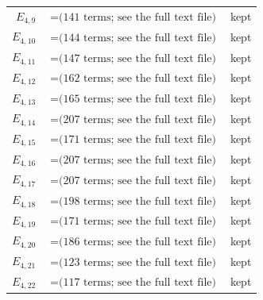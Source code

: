 \documentclass[10pt]{article}
\begin{document}
\begin{longtable}{r>{\raggedright\arraybackslash}p{}>{\raggedright\arraybackslash}p{}}
$E_{4,9}$ & $= \text{(141 terms; see the full text file)}$ & kept \\
$E_{4,10}$ & $= \text{(144 terms; see the full text file)}$ & kept \\
$E_{4,11}$ & $= \text{(147 terms; see the full text file)}$ & kept \\
$E_{4,12}$ & $= \text{(162 terms; see the full text file)}$ & kept \\
$E_{4,13}$ & $= \text{(165 terms; see the full text file)}$ & kept \\
$E_{4,14}$ & $= \text{(207 terms; see the full text file)}$ & kept \\
$E_{4,15}$ & $= \text{(171 terms; see the full text file)}$ & kept \\
$E_{4,16}$ & $= \text{(207 terms; see the full text file)}$ & kept \\
$E_{4,17}$ & $= \text{(207 terms; see the full text file)}$ & kept \\
$E_{4,18}$ & $= \text{(198 terms; see the full text file)}$ & kept \\
$E_{4,19}$ & $= \text{(171 terms; see the full text file)}$ & kept \\
$E_{4,20}$ & $= \text{(186 terms; see the full text file)}$ & kept \\
$E_{4,21}$ & $= \text{(123 terms; see the full text file)}$ & kept \\
$E_{4,22}$ & $= \text{(117 terms; see the full text file)}$ & kept \\

\end{longtable}
\end{document}
